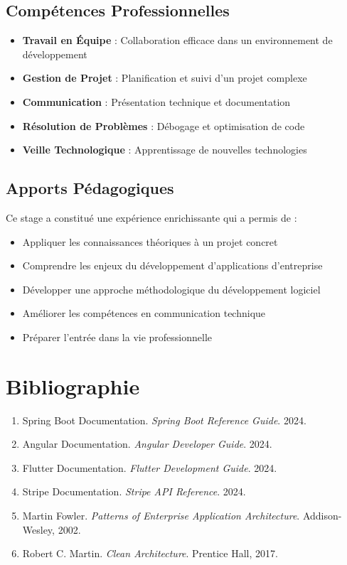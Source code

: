\documentclass[12pt,a4paper]{report}
\begin{document}
\subsection{Compétences Professionnelles}

\begin{itemize}
    \item \textbf{Travail en Équipe} : Collaboration efficace dans un environnement de développement
    \item \textbf{Gestion de Projet} : Planification et suivi d'un projet complexe
    \item \textbf{Communication} : Présentation technique et documentation
    \item \textbf{Résolution de Problèmes} : Débogage et optimisation de code
    \item \textbf{Veille Technologique} : Apprentissage de nouvelles technologies
\end{itemize}

\subsection{Apports Pédagogiques}

Ce stage a constitué une expérience enrichissante qui a permis de :

\begin{itemize}
    \item Appliquer les connaissances théoriques à un projet concret
    \item Comprendre les enjeux du développement d'applications d'entreprise
    \item Développer une approche méthodologique du développement logiciel
    \item Améliorer les compétences en communication technique
    \item Préparer l'entrée dans la vie professionnelle
\end{itemize}

\section{Bibliographie}

\begin{enumerate}
    \item Spring Boot Documentation. \textit{Spring Boot Reference Guide}. 2024.
    \item Angular Documentation. \textit{Angular Developer Guide}. 2024.
    \item Flutter Documentation. \textit{Flutter Development Guide}. 2024.
    \item Stripe Documentation. \textit{Stripe API Reference}. 2024.
    \item Martin Fowler. \textit{Patterns of Enterprise Application Architecture}. Addison-Wesley, 2002.
    \item Robert C. Martin. \textit{Clean Architecture}. Prentice Hall, 2017.
\end{enumerate}
\end{document}
